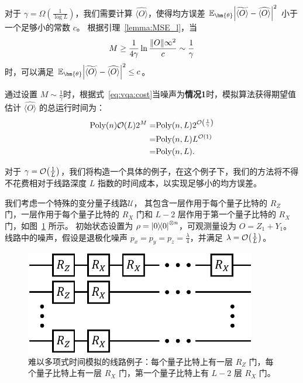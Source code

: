 对于 $\gamma=\Omega(\frac{1}{\log L})$，我们需要计算 $\widehat{\langle O \rangle}$，使得均方误差 $\mathbb{E}_{\bm{\theta}}\abs{\widetilde{\langle O \rangle}-\widehat{\langle O \rangle}}^2$ 小于一个足够小的常数 $c$。 
根据引理~\ref{lemma:MSE_l}，当 
\begin{equation} 
    M\geq \frac{1}{4\gamma} \ln{\frac{\norm{O}\infty^2}{c}} \sim \frac{1}{\gamma} 
\end{equation} 时，可以满足 $\mathbb{E}_{\bm{\theta}}\abs{\widetilde{\langle O \rangle}-\widehat{\langle O \rangle}}^2 \leq c$。

通过设置 $M\sim\frac{1}{\gamma}$时，根据式~\eqref{eq:vqa:cost}当噪声为\textbf{情况1}时，模拟算法获得期望值估计 $\widehat{\langle O \rangle}$ 的总运行时间为：
\begin{equation} 
    \begin{aligned} 
    \mathrm{Poly}(n) \order{L} 2^{M} =&\mathrm{Poly}(n,L) 2^{\order{\frac{1}{\gamma}}}\\ 
    =&\mathrm{Poly}(n,L) L^{\order{1}}\\
    =&\mathrm{Poly}(n,L). 
\end{aligned} 
\end{equation} 

对于 $\gamma=\order{\frac{1}{L}}$，我们将构造一个具体的例子，在这个例子下，我们的方法将不得不花费相对于线路深度 $L$ 指数的时间成本，以实现足够小的均方误差。

我们考虑一个特殊的变分量子线路$\mathcal{U}$， 其包含一层作用于每个量子比特的 $R_Z$ 门，一层作用于每个量子比特的 $R_X$ 门和 $L-2$ 层作用于第一个量子比特的 $R_X$ 门，如图~\ref{ap:prop:fig:ansatz} 所示。 
初始状态设置为 $\rho=\ketbra{0}{0}^{\otimes n}$，可观测量设为 $O=Z_1+Y_1$。
线路中的噪声，假设是退极化噪声 $p_x = p_y = p_z = \frac{\lambda}{4}$，并满足 $\lambda=\order{\frac{1}{L}}$。

\begin{figure}[tbp] 
    \centering
    \includegraphics[width=0.9\textwidth]{figures/Z_Ansatz.pdf} \caption{难以多项式时间模拟的线路例子：每个量子比特上有一层 $R_Z$ 门，每个量子比特上有一层 $R_X$ 门，第一个量子比特上有 $L-2$ 层 $R_X$ 门。}\label{ap:prop:fig:ansatz} 
\end{figure}


